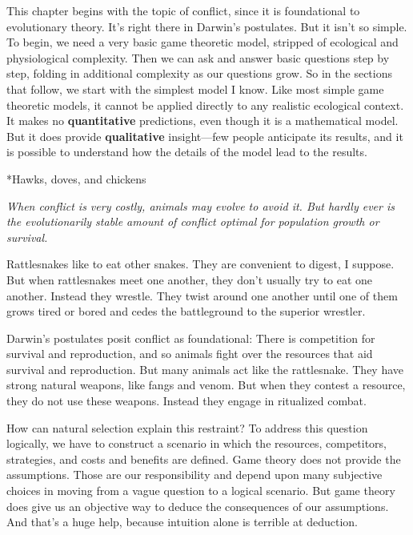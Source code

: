 \documentclass[10pt,reqno]{amsbook}
\makeatletter
\newcommand{\bemph}[1]{{\textbf{\textcolor{bemphcol}{#1}}}}
\renewcommand\section{\@startsection{section}{1}
\z@{.7\linespacing\@plus\linespacing}{.5\linespacing}
{\large\bfseries\itshape}}
\numberwithin{equation}{chapter}
\newenvironment{precis}
{\noi\itshape}
{\vspace{6pt}}
\newcommand{\noi}{\noindent}
\makeatother
\begin{document}
This chapter begins with the topic of conflict, since it is foundational to evolutionary theory. It's right there in Darwin's postulates. But it isn't so simple. To begin, we need a very basic game theoretic model, stripped of ecological and physiological complexity. Then we can ask and answer basic questions step by step, folding in additional complexity as our questions grow. So in the sections that follow, we start with the simplest model I know. Like most simple game theoretic models, it cannot be applied directly to any realistic ecological context. It makes no \bemph{quantitative} predictions, even though it is a mathematical model. But it does provide \bemph{qualitative} insight---few people anticipate its results, and it is possible to understand how the details of the model lead to the results.


\section*{Hawks, doves, and chickens}

\begin{precis}When conflict is very costly, animals may evolve to avoid it. But hardly ever is the evolutionarily stable amount of conflict optimal for population growth or survival.\end{precis}

Rattlesnakes like to eat other snakes. They are convenient to digest, I suppose. But when rattlesnakes meet one another, they don't usually try to eat one another. Instead they wrestle. They twist around one another until one of them grows tired or bored and cedes the battleground to the superior wrestler. 

Darwin's postulates posit conflict as foundational: There is competition for survival and reproduction, and so animals fight over the resources that aid survival and reproduction. But many animals act like the rattlesnake. They have strong natural weapons, like fangs and venom. But when they contest a resource, they do not use these weapons. Instead they engage in ritualized combat. 

How can natural selection explain this restraint? To address this question logically, we have to construct a scenario in which the resources, competitors, strategies, and costs and benefits are defined. Game theory does not provide the assumptions. Those are our responsibility and depend upon many subjective choices in moving from a vague question to a logical scenario. But game theory does give us an objective way to deduce the consequences of our assumptions. And that's a huge help, because intuition alone is terrible at deduction.
\end{document}
